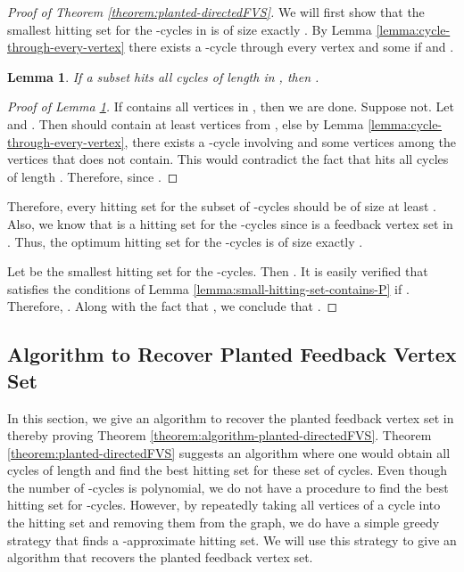 \documentclass[11pt]{article}
\newtheorem{lemma}[theorem]{Lemma}
\begin{document}
\begin{proof}[Proof of Theorem \ref{theorem:planted-directedFVS}]
We will first show that the smallest hitting set for the -cycles in  is of size exactly .
By Lemma \ref{lemma:cycle-through-every-vertex} there exists a -cycle through every vertex  and some  if  and .
\begin{lemma}\label{lemma:lower-bound-HS}
If a subset  hits all cycles of length  in , then .
\end{lemma}
\begin{proof}[Proof of Lemma \ref{lemma:lower-bound-HS}]
If  contains all vertices in , then we are done. Suppose not. Let  and . Then  should contain at least  vertices from , else by Lemma \ref{lemma:cycle-through-every-vertex}, there exists a -cycle involving  and some  vertices among the  vertices that  does not contain. This would contradict the fact that  hits all cycles of length . Therefore,  since .
\end{proof}

Therefore, every hitting set for the subset of -cycles should be of size at least . Also, we know that  is a hitting set for the -cycles since  is a feedback vertex set in . Thus, the optimum hitting set for the -cycles is of size exactly .

Let  be the smallest hitting set for the -cycles. Then . It is easily verified that  satisfies the conditions of Lemma \ref{lemma:small-hitting-set-contains-P} if . Therefore, . Along with the fact that , we conclude that .
\end{proof}

\subsection{Algorithm to Recover Planted Feedback Vertex Set}
In this section, we give an algorithm to recover the planted feedback vertex set in  thereby proving Theorem \ref{theorem:algorithm-planted-directedFVS}. Theorem \ref{theorem:planted-directedFVS} suggests an algorithm where one would obtain all cycles of length  and find the best hitting set for these set of cycles. Even though the number of -cycles is polynomial, we do not have a procedure to find the best hitting set for -cycles. However, by repeatedly taking all vertices of a cycle into the hitting set and removing them from the graph, we do have a simple greedy strategy that finds a -approximate hitting set. We will use this strategy to give an algorithm that recovers the planted feedback vertex set.
\end{document}
